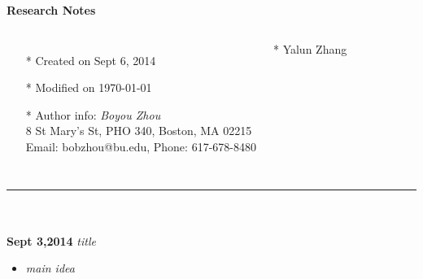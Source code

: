 \documentclass[]{article}
\begin{document}
\pagestyle{empty}
{\large\textbf{Research Notes}}

\begin{columns}


    \begin{itemize}
        \item[*] Created on Sept 6, 2014
        \item[*] Modified on \today
        \item[*] Author info: \textit {Boyou Zhou}\\
                 8 St Mary's St, PHO 340, Boston, MA 02215\\
                 Email: bobzhou@bu.edu, Phone: 617-678-8480
    \end{itemize}

        \item [ ] 
        \item [ ] 
        \item [*] Yalun Zhang

    \end{columns}

\rule[-0.1cm]{7.5in}{0.01cm}\\
\\
\noindent \textbf{Sept 3,2014}
\textit{title}
\indent		\begin{itemize}

            \item \textit{main idea}
        \end{itemize}
\end{document}
